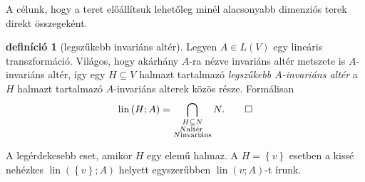 \documentclass[9pt, a4paper, showtrims]{memoir}
\theoremstyle{plain}
\theoremstyle{remark}
\theoremstyle{definition}
\newtheorem{definition}[proposition]{definíció}
\DeclareMathOperator{\lin}{lin}
\begin{document}
A célunk, hogy a teret előállítsuk lehetőleg minél alacsonyabb dimenziós terek direkt összegeként.

\begin{definition}[legszűkebb invariáns altér]
	Legyen $A\in L\left( V \right)$ egy lineáris transzformáció.
	Világos, hogy akárhány $A$-ra nézve invariáns altér metszete is $A$-invariáns altér,
	így egy $H\subseteq V$ halmazt tartalmazó
	\emph{legszűkebb $A$-invariáns altér}
	a $H$ halmazt tartalmazó $A$-invariáns alterek közös része.
	Formálisan
	\[
		\lin\left( H;A \right)
		=
		\bigcap_{
			\substack{
				H\subseteq N\\
				N\text{altér }\\
				N\text{invariáns}}
		}N.\qedhere
	\]
\end{definition}
A legérdekesebb eset, amikor $H$ egy elemű halmaz.
A $H=\left\{ v \right\}$ esetben a kissé nehézkes
$\lin\left( \left\{ v \right\};A \right)$ helyett egyszerűbben $\lin\left( v;A \right)$-t írunk.
\end{document}
